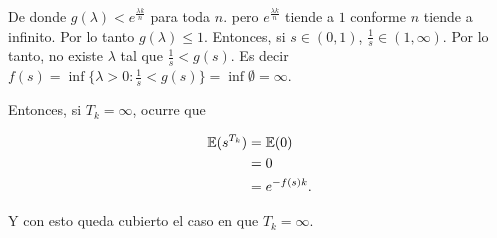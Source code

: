    De donde $g(\lambda) < e^{\frac{\lambda k}{n}}$ para toda $n$. pero $e^{\frac{\lambda k}{n}}$ tiende
    a $1$ conforme $n$ tiende a infinito. Por lo tanto $g(\lambda) \leq 1$. Entonces, si $s \in (0,1)$, 
    $\frac{1}{s} \in (1, \infty)$. Por lo tanto, no existe $\lambda$ tal que $\frac{1}{s} < g(s)$.
    Es decir $f(s) = \inf \{ \lambda > 0 : \frac{1}{s} < g(s)\} = \inf \emptyset = \infty$.\par\null
    
    Entonces, si $T_k = \infty$, ocurre que
    
    \begin{align}
        \mathbb{E}(s^{T_k})     &= \mathbb{E}(0) \\
                        &= 0     \\
                        &= e^{-f(s) k}.
    \end{align}
    
    Y con esto queda cubierto el caso en que $T_k = \infty$.
